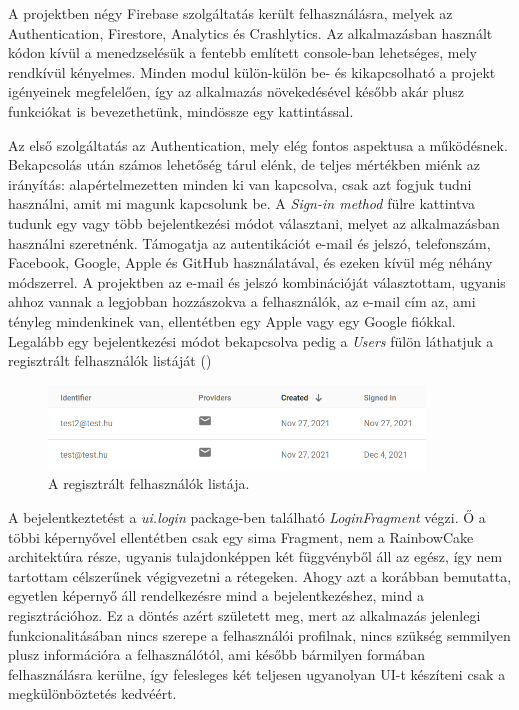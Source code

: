 A projektben négy Firebase szolgáltatás került felhasználásra, melyek az Authentication, Firestore, Analytics és Crashlytics. Az alkalmazásban használt kódon kívül a menedzselésük a fentebb említett console-ban lehetséges, mely rendkívül kényelmes. Minden modul külön-külön be- és kikapcsolható a projekt igényeinek megfelelően, így az alkalmazás növekedésével később akár plusz funkciókat is bevezethetünk, mindössze egy kattintással.

Az első szolgáltatás az Authentication, mely elég fontos aspektusa a működésnek. Bekapcsolás után számos lehetőség tárul elénk, de teljes mértékben miénk az irányítás: alapértelmezetten minden ki van kapcsolva, csak azt fogjuk tudni használni, amit mi magunk kapcsolunk be. A \emph{Sign-in method} fülre kattintva tudunk egy vagy több bejelentkezési módot választani, melyet az alkalmazásban használni szeretnénk. Támogatja az autentikációt e-mail és jelszó, telefonszám, Facebook, Google, Apple és GitHub használatával, és ezeken kívül még néhány módszerrel. A projektben az e-mail és jelszó kombinációját választottam, ugyanis ahhoz vannak a legjobban hozzászokva a felhasználók, az e-mail cím az, ami tényleg mindenkinek van, ellentétben egy Apple vagy egy Google fiókkal. Legalább egy bejelentkezési módot bekapcsolva pedig a \emph{Users} fülön láthatjuk a regisztrált felhasználók listáját ()

\begin{figure}[!ht]
	\centering
	\includegraphics[width=100mm, keepaspectratio]{figures/auth_users.png}
	\caption{A regisztrált felhasználók listája.}
	\label{fig:AuthUsers}
\end{figure}

A bejelentkeztetést a \emph{ui.login} package-ben található \emph{LoginFragment} végzi. Ő a többi képernyővel ellentétben csak egy sima Fragment, nem a RainbowCake architektúra része, ugyanis tulajdonképpen két függvényből áll az egész, így nem tartottam célszerűnek végigvezetni a rétegeken. Ahogy azt a  korábban bemutatta, egyetlen képernyő áll rendelkezésre mind a bejelentkezéshez, mind a regisztrációhoz. Ez a döntés azért született meg, mert az alkalmazás jelenlegi funkcionalitásában nincs szerepe a felhasználói profilnak, nincs szükség semmilyen plusz információra a felhasználótól, ami később bármilyen formában felhasználásra kerülne, így felesleges két teljesen ugyanolyan UI-t készíteni csak a megkülönböztetés kedvéért.

